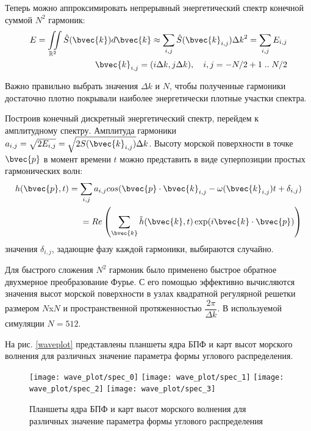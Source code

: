 Теперь можно аппроксимировать непрерывный энергетический спектр конечной суммой $N^2$ гармоник:
\begin{equation}
\begin{split}
E = \iint\limits_{\mathbb{R}^2} \hat{S}(\bvec{k})d\bvec{k}
    \approx \sum_{i,j} \hat{S}(\bvec{k}_{i,j}) {\Delta k}^2 
    = \sum_{i,j} E_{i,j}\\
\bvec{k}_{i,j} = (i\Delta k, j\Delta k), \quad i,j = -N/2+1 \; .. \; N/2 
\end{split}
\end{equation}

Важно правильно выбрать значения $\Delta k$ и $N$, чтобы полученные гармоники достаточно плотно покрывали наиболее энергетически плотные участки спектра.

Построив конечный дискретный энергетический спектр, перейдем к амплитудному спектру. Амплитуда гармоники $a_{i,j} = \sqrt{2E_{i,j}} = \sqrt{2S(\bvec{k}_{i,j})}\Delta k$. Высоту морской поверхности в точке $\bvec{p}$ в момент времени $t$ можно представить в виде суперпозиции простых гармонических волн:
\begin{equation}
\label{wave_height}
\begin{split}
h(\bvec{p}, t) = \sum_{i,j} a_{i,j}cos(\bvec{p}\cdot \bvec{k}_{i,j} - \omega(\bvec{k}_{i,j})t + \delta_{i,j}) \\
= Re\left( \sum_{\bvec{k}} \tilde{h}(\bvec{k}, t)
 \exp(i\bvec{k} \cdot \bvec{p}) \right)
\end{split}
\end{equation}
значения $\delta_{i,j}$, задающие фазу каждой гармоники, выбираются случайно.

Для быстрого сложения $N^2$ гармоник было применено быстрое обратное двухмерное преобразование Фурье. С его помощью эффективно вычисляются значения высот морской поверхности в узлах квадратной регулярной решетки размером $N$x$N$ и пространственной протяженностью $\dfrac{2\pi}{\Delta k}$. В используемой симуляции $N = 512$.

На рис. \ref{waveplot} представлены планшеты ядра БПФ и карт высот морского волнения для различных значение параметра формы углового распределения.

\begin{figure}[ht]
\begin{center}
\texttt{[image: wave\_plot/spec\_0]}
\texttt{[image: wave\_plot/spec\_1]}
\texttt{[image: wave\_plot/spec\_2]}
\texttt{[image: wave\_plot/spec\_3]}
\end{center}
\caption{Планшеты ядра БПФ и карт высот морского волнения для различных значение параметра формы углового распределения}
\label{boat_axis}
\end{figure}

